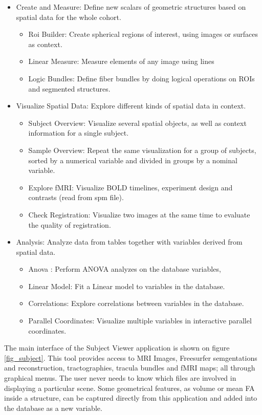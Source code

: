 \documentclass[utf8,paper]{frontiersSCNS} %
\begin{document}
\begin{itemize}
\item Create and Measure: Define new scalars of geometric structures based on spatial data for the whole cohort.
\begin{itemize}
\item Roi Builder: Create spherical regions of interest, using images or surfaces as context.
\item Linear Measure: Measure elements of any image using lines
\item Logic Bundles: Define fiber bundles by doing logical operations on ROIs and segmented structures.
\end{itemize}
\item Visualize Spatial Data: Explore different kinds of spatial data in context.
\begin{itemize}
\item Subject Overview: Visualize several spatial objects, as well as context information for a single subject.
\item Sample Overview: Repeat the same visualization for a group of subjects, sorted by a numerical variable and divided in groups by a nominal variable.
\item Explore fMRI: Visualize BOLD timelines, experiment design and contrasts (read from spm file).
\item Check Registration: Visualize two images at the same time to evaluate the quality of registration. 
\end{itemize}
\item Analysis: Analyze data from tables together with variables derived from spatial data. 
\begin{itemize}
\item Anova : Perform ANOVA analyzes on the database variables,
\item Linear Model: Fit a Linear model to variables in the database.
\item Correlations: Explore correlations between variables in the database.
\item Parallel Coordinates: Visualize multiple variables in interactive parallel coordinates.
\end{itemize}
\end{itemize} 

The main interface of the Subject Viewer application is shown on figure \ref{fig_subject}. This tool provides access to MRI Images, Freesurfer semgentations and reconstruction, tractographies, tracula bundles and fMRI maps; all through graphical menus. The user never needs to know which files are involved in displaying a particular scene. Some geometrical features, as volume or mean FA inside a structure, can be captured directly from  this application and added into the database as a new variable. 
\end{document}
